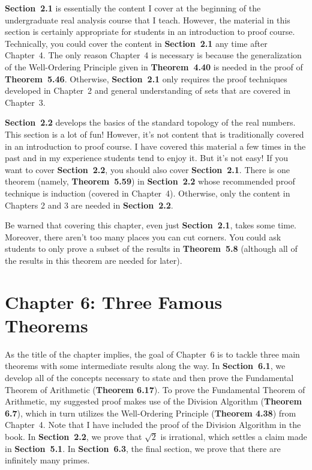 \documentclass[11pt]{article}%
\newcommand{\blankline}{\pagebreak[2]\vspace{.5\baselineskip}}
\begin{document}
\blankline

\textbf{Section~2.1} is essentially the content I cover at the beginning of the undergraduate real analysis course that I teach.  However, the material in this section is certainly appropriate for students in an introduction to proof course. Technically, you could cover the content in \textbf{Section~2.1} any time after Chapter~4.  The only reason Chapter~4 is necessary is because the generalization of the Well-Ordering Principle given in \textbf{Theorem~4.40} is needed in the proof of \textbf{Theorem~5.46}.   Otherwise, \textbf{Section~2.1} only requires the proof techniques developed in Chapter~2 and general understanding of sets that are covered in Chapter~3.

\blankline

\textbf{Section~2.2} develops the basics of the standard topology of the real numbers.  This section is a lot of fun!  However, it's not content that is traditionally covered in an introduction to proof course.  I have covered this material a few times in the past and in my experience students tend to enjoy it.  But it's not easy!  If you want to cover \textbf{Section~2.2}, you should also cover \textbf{Section~2.1}.  There is one theorem (namely, \textbf{Theorem~5.59}) in \textbf{Section~2.2} whose recommended proof technique is induction (covered in Chapter~4).  Otherwise, only the content in Chapters 2 and 3 are needed in \textbf{Section~2.2}.

\blankline

Be warned that covering this chapter, even just \textbf{Section~2.1}, takes some time.  Moreover, there aren't too many places you can cut corners.  You could ask students to only prove a subset of the results in \textbf{Theorem~5.8} (although all of the results in this theorem are needed for later).


\section*{Chapter 6: Three Famous Theorems}

As the title of the chapter implies, the goal of Chapter~6 is to tackle three main theorems with some intermediate results along the way.  In \textbf{Section~6.1}, we develop all of the concepts necessary to state and then prove the Fundamental Theorem of Arithmetic (\textbf{Theorem 6.17}). To prove the Fundamental Theorem of Arithmetic, my suggested proof makes use of the Division Algorithm (\textbf{Theorem 6.7}), which in turn utilizes the Well-Ordering Principle (\textbf{Theorem 4.38}) from Chapter~4. Note that I have included the proof of the Division Algorithm in the book. In \textbf{Section~2.2}, we prove that $\sqrt{2}$ is irrational, which settles a claim made in \textbf{Section~5.1}. In \textbf{Section~6.3}, the final section, we prove that there are infinitely many primes.  
\end{document}
